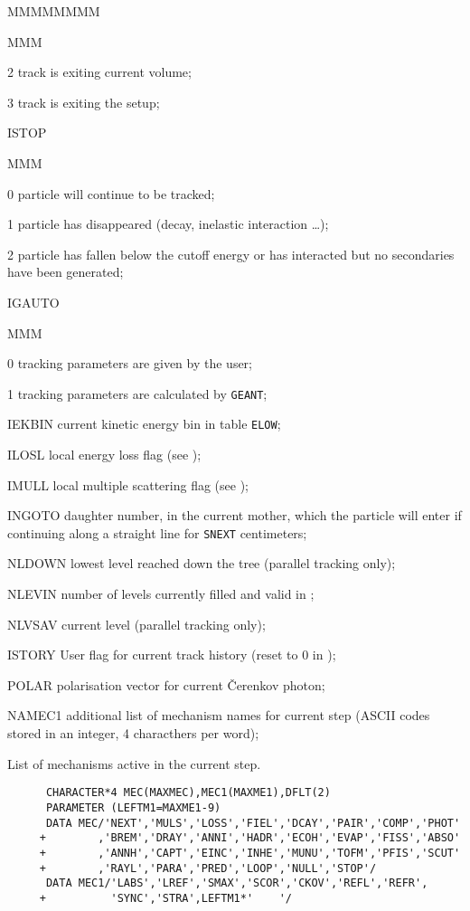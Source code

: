 \begin{DLtt}{MMMMMMMM}
\begin{DLtt}{MMM}
\item[2]track is exiting current volume;
\item[3]track is exiting the setup;
\end{DLtt}
\item[ISTOP]
\begin{DLtt}{MMM}
\item[0]particle will continue to be tracked;
\item[1]particle has disappeared (decay, inelastic interaction \dots);
\item[2]particle has fallen below the cutoff energy or has interacted but
no secondaries have been generated;
\end{DLtt}
\item[IGAUTO]
\begin{DLtt}{MMM}
\item[0]tracking parameters are given by the user;
\item[1]tracking parameters are calculated by {\tt GEANT};
\end{DLtt}
\item[IEKBIN]current kinetic energy bin in table {\tt ELOW};
\item[ILOSL]local energy loss flag (see );
\item[IMULL]local multiple scattering flag (see );
\item[INGOTO] daughter number, in the current mother,
which the particle will enter if continuing along
a straight line for {\tt SNEXT} centimeters;
\item[NLDOWN]lowest level reached down the tree (parallel tracking only);
\item[NLEVIN]number of levels currently filled and valid in ;
\item[NLVSAV]current level (parallel tracking only);
\item[ISTORY]User flag for current track history (reset to $0$ in
);
\item[POLAR]polarisation vector for current \v{C}erenkov photon;
\item[NAMEC1]additional list of mechanism names for current step
(ASCII codes stored in an integer, 4 characthers per word);
\end{DLtt}
List of mechanisms active in the current step.
\begin{verbatim}
      CHARACTER*4 MEC(MAXMEC),MEC1(MAXME1),DFLT(2)
      PARAMETER (LEFTM1=MAXME1-9)
      DATA MEC/'NEXT','MULS','LOSS','FIEL','DCAY','PAIR','COMP','PHOT'
     +        ,'BREM','DRAY','ANNI','HADR','ECOH','EVAP','FISS','ABSO'
     +        ,'ANNH','CAPT','EINC','INHE','MUNU','TOFM','PFIS','SCUT'
     +        ,'RAYL','PARA','PRED','LOOP','NULL','STOP'/
      DATA MEC1/'LABS','LREF','SMAX','SCOR','CKOV','REFL','REFR',
     +          'SYNC','STRA',LEFTM1*'    '/
\end{verbatim}
